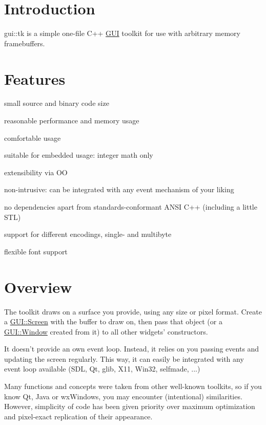 \hypertarget{gui_1_1tk_i}{}\section{Introduction}\label{gui_1_1tk_i}
gui\-::tk is a simple one-\/file C++ \hyperlink{namespaceGUI}{G\-U\-I} toolkit for use with arbitrary memory framebuffers.\hypertarget{gui_1_1tk_f}{}\section{Features}\label{gui_1_1tk_f}
\begin{DoxyItemize}
\item small source and binary code size \item reasonable performance and memory usage \item comfortable usage \item suitable for embedded usage\-: integer math only \item extensibility via O\-O \item non-\/intrusive\-: can be integrated with any event mechanism of your liking \item no dependencies apart from standards-\/conformant A\-N\-S\-I C++ (including a little S\-T\-L) \item support for different encodings, single-\/ and multibyte \item flexible font support\end{DoxyItemize}
\hypertarget{gui_1_1tk_o}{}\section{Overview}\label{gui_1_1tk_o}
The toolkit draws on a surface you provide, using any size or pixel format. Create a \hyperlink{classGUI_1_1Screen}{G\-U\-I\-::\-Screen} with the buffer to draw on, then pass that object (or a \hyperlink{classGUI_1_1Window}{G\-U\-I\-::\-Window} created from it) to all other widgets' constructors.

It doesn't provide an own event loop. Instead, it relies on you passing events and updating the screen regularly. This way, it can easily be integrated with any event loop available (S\-D\-L, Qt, glib, X11, Win32, selfmade, ...)

Many functions and concepts were taken from other well-\/known toolkits, so if you know Qt, Java or wx\-Windows, you may encounter (intentional) similarities. However, simplicity of code has been given priority over maximum optimization and pixel-\/exact replication of their appearance.


